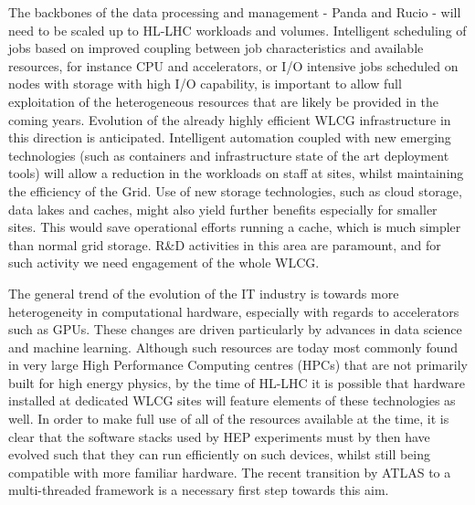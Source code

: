 The backbones of the data processing and management - Panda and Rucio - will need to be scaled up to HL-LHC workloads and volumes. Intelligent scheduling of jobs based on improved coupling between job characteristics and available resources, for instance CPU and accelerators, or I/O intensive jobs scheduled on nodes with storage with high I/O capability, is important to allow full exploitation of the heterogeneous resources that are likely be provided in the coming years. Evolution of the already highly efficient WLCG infrastructure in this direction is anticipated. Intelligent automation coupled with new emerging technologies (such as containers and infrastructure state of the art deployment tools)  will allow a reduction in the workloads on staff at sites, whilst maintaining the efficiency of the Grid. Use of new storage technologies, such as cloud storage, data lakes and caches, might also yield further benefits especially for smaller sites. This would save operational efforts running a cache, which is much simpler than normal grid storage. R\&D activities in this area are paramount, and for such activity we need engagement of the whole WLCG.

The general trend of the evolution of the IT industry is towards more heterogeneity in computational hardware, especially with regards to accelerators such as GPUs. These changes are driven particularly by advances in data science and machine learning. Although such resources are today most commonly found in very large High Performance Computing centres (HPCs) that are not primarily built for high energy physics, by the time of HL-LHC it is possible that hardware installed at dedicated WLCG sites will feature elements of these technologies as well. In order to make full use of all of the resources available at the time, it is clear that the software stacks used by HEP experiments must by then have evolved such that they can run efficiently on such devices, whilst still being compatible with more familiar hardware. The recent transition by ATLAS to a multi-threaded framework is a necessary first step towards this aim.\\

